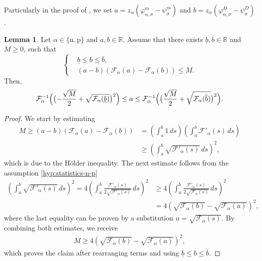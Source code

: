 \documentclass[10pt,a4paper, final]{article}
\def\electrons{\text{n}}
\def\holes{\text{p}}
\theoremstyle{definition}								%
\newtheorem{lemma}[theorem]{Lemma}					%
\numberwithin{equation}{section}
\numberwithin{figure}{section}
\numberwithin{theorem}{section}
\begin{document}
Particularly in the proof of , we set $a = z_\alpha (\varphi_{\alpha, \sigma}^m - \psi_\sigma^m)$ and $b = z_\alpha (\varphi_{\alpha, \sigma}^D - \psi_\sigma^D)$.
\begin{lemma} \label{lem:bound-boundary-density}
    Let $\alpha \in \{ \electrons, \holes \}$ and $a, b \in \mathbb{R}$.
    Assume that there exists $\underline{b}, \overline{b} \in \mathbb{R}$ and $M \geq 0$, such that
    \begin{equation*}
        \left\{
        \begin{aligned}
            &\underline{b} \leq b \leq \overline{b},\\[.5em]
            & (a-b) \left( \mathcal{F}_\alpha(a) - \mathcal{F}_\alpha (b) \right) \leq M.
        \end{aligned}
        \right.
    \end{equation*}
    Then,
    \begin{equation*}
        \mathcal{F}^{-1}_\alpha \Bigl( \bigl(- \frac{\sqrt{M}}{2} + \sqrt{ \mathcal{F}_\alpha(\underline{b})}\bigr)^2 \Bigr)
        \leq
        a
        \leq
        \mathcal{F}^{-1}_\alpha \Bigl( \bigl( \frac{\sqrt{M}}{2} + \sqrt{ \mathcal{F}_\alpha(\overline{b})}\bigr)^2 \Bigr).
    \end{equation*}
\end{lemma}
\begin{proof}
    We start by estimating
    \begin{align*}
        M \geq (a-b) \left( \mathcal{F}_\alpha(a) - \mathcal{F}_\alpha (b) \right)
        &= \left( \int_{a}^{b} 1 \, ds \right) \left(  \int_{a}^{b} \mathcal{F}'_\alpha(s) \, ds\right)\\
        &\geq \left(  \int_{a}^{b} \sqrt{\mathcal{F}'_\alpha(s)} \, ds\right)^2,
    \end{align*}
which is due to the Hölder inequality.
The next estimate follows from the assumption \eqref{hyp:statistics-n-p}    \begin{align*}
    \left(  \int_{a}^{b} \sqrt{\mathcal{F}'_\alpha(s)} \, ds\right)^2
    =
    4 \left(  \int_{a}^{b} \frac{\mathcal{F}'_\alpha(s)}{2 \sqrt{\mathcal{F}'_\alpha(s)}} \, ds\right)^2
    &\geq 4 \left(  \int_{a}^{b} \frac{\mathcal{F}'_\alpha(s)}{2 \sqrt{\mathcal{F}_\alpha(s)}} \, ds\right)^2\\
    &= 4 \left(  \sqrt{\mathcal{F}_\alpha(b)} - \sqrt{\mathcal{F}_\alpha(a)} \right)^2,
\end{align*}
where the last equality can be proven by a substitution $u = \sqrt{\mathcal{F}_\alpha(s) }$.
By combining both estimates, we receive
\begin{align*}
    M \geq 4 \left(  \sqrt{\mathcal{F}_\alpha(b)} - \sqrt{\mathcal{F}_\alpha(a)} \right)^2,
\end{align*}
which proves the claim after rearranging terms and using $\underline{b} \leq b \leq \overline{b}$.
\end{proof}
\end{document}
